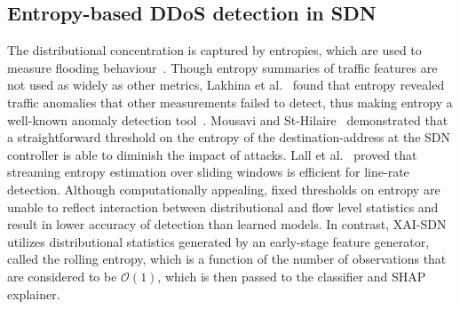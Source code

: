 \documentclass{ieeeaccess}
\begin{document}
\subsection{Entropy-based DDoS detection in SDN}
The distributional concentration is captured by entropies, which are used to measure flooding behaviour~\cite{nychis2008entropy}. Though entropy summaries of traffic features are not used as widely as other metrics, Lakhina et al.~\cite{lakhina2005mining} found that entropy revealed traffic anomalies that other measurements failed to detect, thus making entropy a well-known anomaly detection tool~\cite{bhuyan2014network}. Mousavi and St-Hilaire~\cite{mousavi2015early} demonstrated that a straightforward threshold on the entropy of the destination-address at the SDN controller is able to diminish the impact of attacks. Lall et al.~\cite{lall2006entropy} proved that streaming entropy estimation over sliding windows is efficient for line-rate detection. Although computationally appealing, fixed thresholds on entropy are unable to reflect interaction between distributional and flow level statistics and result in lower accuracy of detection than learned models. In contrast, XAI-SDN utilizes distributional statistics generated by an early-stage feature generator, called the rolling entropy, which is a function of the number of observations that are considered to be $\mathcal{O}(1)$, which is then passed to the classifier and SHAP explainer.
\end{document}
